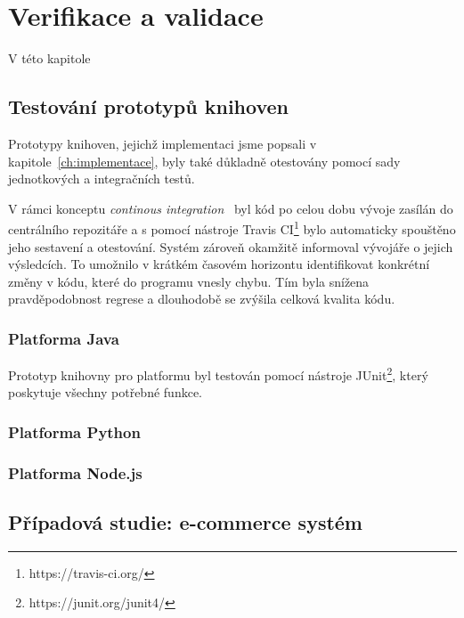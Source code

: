 \usepackage[T1]{fontenc}
\usepackage[utf8]{inputenc}


\chapter{Verifikace a validace}\label{ch:verifikace}

V této kapitole %

\section{Testování prototypů knihoven}

Prototypy knihoven, jejichž implementaci jsme popsali
v kapitole~\ref{ch:implementace}, byly také důkladně
otestovány pomocí sady jednotkových a integračních testů.

V rámci konceptu \textit{continous integration}~\cite{fowler2006continuous}
byl kód po celou dobu vývoje zasílán do centrálního repozitáře
a s pomocí nástroje Travis CI\footnote{https://travis-ci.org/}
bylo automaticky spouštěno jeho sestavení a otestování. Systém
zároveň okamžitě informoval vývojáře o jejich výsledcích. To
umožnilo v krátkém časovém horizontu identifikovat konkrétní změny
v kódu, které do programu vnesly chybu. Tím byla snížena
pravděpodobnost regrese a dlouhodobě se zvýšila celková kvalita kódu.

\subsection{Platforma Java}

Prototyp knihovny pro platformu byl testován pomocí
nástroje JUnit\footnote{https://junit.org/junit4/},
který poskytuje všechny potřebné funkce.

\subsection{Platforma Python}

\subsection{Platforma Node.js}

\section{Případová studie: e-commerce systém}

